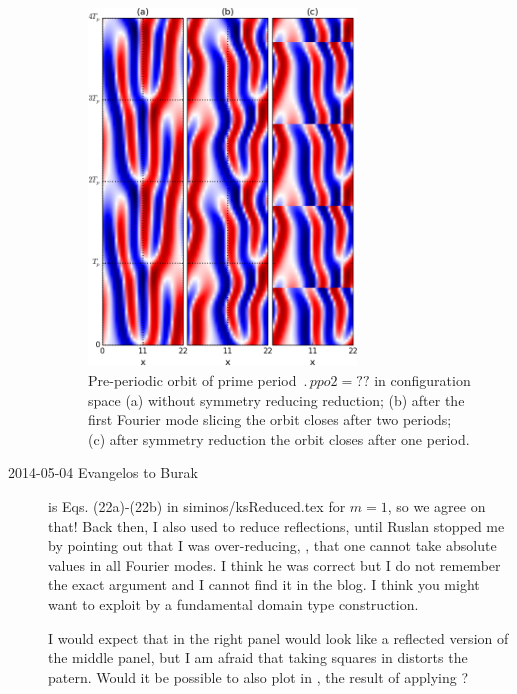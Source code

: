\begin{description}
\begin{figure}[h]
  \centering
  \includegraphics[width=0.7\textwidth]{../xiong/figures/ppo2_state}
  \caption{
Pre-periodic orbit  of prime period  $\period{ppo2} =??$
in configuration space
(a) without symmetry reducing reduction;
(b) after the first Fourier mode  slicing the orbit
closes after two periods;
(c) after  symmetry reduction the orbit closes after one
period.
    }
  \label{fig:ppo2_states_reduced}
\end{figure}


\item[2014-05-04 Evangelos to Burak]  is Eqs. (22a)-(22b)
in siminos/ksReduced.tex for $m=1$, so we agree on that! Back then, I also
used  to reduce reflections, until Ruslan stopped me
by pointing out that I was over-reducing, \ie, that one cannot take absolute
values in all Fourier modes. I think he was correct but I do not remember the
exact argument and I cannot find it in the blog. I think you might want to exploit
 by a fundamental domain type construction.

I would expect that in 
the right panel would look like a reflected version of the
middle panel, but I am afraid that taking squares in 
distorts the patern.
Would it be possible to also plot in ,
the result of applying ?


\end{description}
